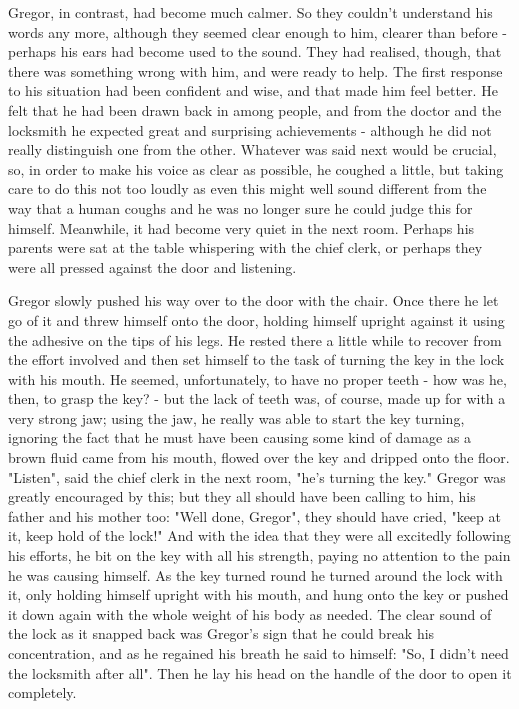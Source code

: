 \documentclass[12pt]{book}
\begin{document}
    Gregor, in contrast, had become much calmer. So they couldn't understand his words any more, although they seemed clear enough to him, clearer than before - perhaps his ears had become used to the sound. They had realised, though, that there was something wrong with him, and were ready to help. The first response to his situation had been confident and wise, and that made him feel better. He felt that he had been drawn back in among people, and from the doctor and the locksmith he expected great and surprising achievements - although he did not really distinguish one from the other. Whatever was said next would be crucial, so, in order to make his voice as clear as possible, he coughed a little, but taking care to do this not too loudly as even this might well sound different from the way that a human coughs and he was no longer sure he could judge this for himself. Meanwhile, it had become very quiet in the next room. Perhaps his parents were sat at the table whispering with the chief clerk, or perhaps they were all pressed against the door and listening.

    Gregor slowly pushed his way over to the door with the chair. Once there he let go of it and threw himself onto the door, holding himself upright against it using the adhesive on the tips of his legs. He rested there a little while to recover from the effort involved and then set himself to the task of turning the key in the lock with his mouth. He seemed, unfortunately, to have no proper teeth - how was he, then, to grasp the key? - but the lack of teeth was, of course, made up for with a very strong jaw; using the jaw, he really was able to start the key turning, ignoring the fact that he must have been causing some kind of damage as a brown fluid came from his mouth, flowed over the key and dripped onto the floor. "Listen", said the chief clerk in the next room, "he's turning the key." Gregor was greatly encouraged by this; but they all should have been calling to him, his father and his mother too: "Well done, Gregor", they should have cried, "keep at it, keep hold of the lock!" And with the idea that they were all excitedly following his efforts, he bit on the key with all his strength, paying no attention to the pain he was causing himself. As the key turned round he turned around the lock with it, only holding himself upright with his mouth, and hung onto the key or pushed it down again with the whole weight of his body as needed. The clear sound of the lock as it snapped back was Gregor's sign that he could break his concentration, and as he regained his breath he said to himself: "So, I didn't need the locksmith after all". Then he lay his head on the handle of the door to open it completely.
\end{document}
